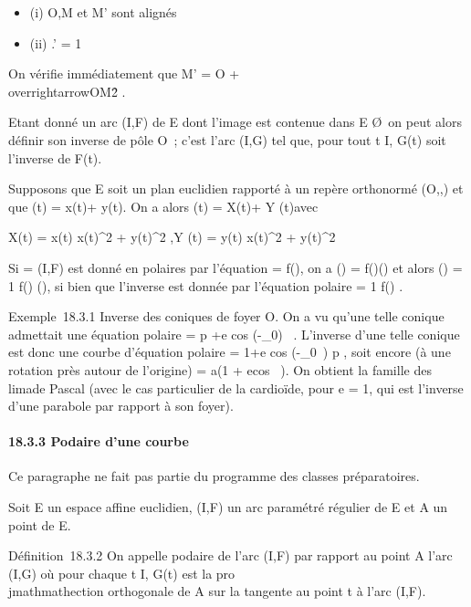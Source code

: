\documentclass[]{article}
\begin{document}
\begin{itemize}
\itemsep1pt\parskip0pt
\item
  (i) O,M et M' sont alignés
\item
  (ii) \overlineOM.\overlineOM' =
  1
\end{itemize}

On vérifie immédiatement que M' = O +
\overrightarrowOM \over
\\overrightarrowOM\^2
.

Etant donné un arc (I,F) de E dont l'image est contenue dans E
\diagdown\O\, on peut alors définir son
inverse de pôle O~; c'est l'arc (I,G) tel que, pour tout t \in I, G(t)
soit l'inverse de F(t).

Supposons que E soit un plan euclidien rapporté à un repère orthonormé
(O,\vec\imath,) et que
\overrightarrowOF(t) = x(t)\vec\imath +
y(t). On a alors
\overrightarrowOG(t) = X(t)\vec\imath +
Y (t) avec

X(t) = x(t) \over x(t)^2 +
y(t)^2 ,\quad Y (t) = y(t)
\over x(t)^2 + y(t)^2

Si \Gamma = (I,F) est donné en polaires par l'équation \rho = f(\theta), on a
\overrightarrowOF(\theta) =
f(\theta)\vecu(\theta) et alors
\overrightarrowOG(\theta) = 1 \over
f(\theta) \vecu(\theta), si bien que l'inverse est donnée par
l'équation polaire \rho = 1 \over f(\theta) .

Exemple~18.3.1 Inverse des coniques de foyer O. On a vu qu'une telle
conique admettait une équation polaire \rho = p +e cos (\theta-\theta_0)~ . L'inverse d'une
telle conique est donc une courbe d'équation polaire \rho =
1+e cos (\theta-\theta_0~) \over
p , soit encore (à une rotation près autour de l'origine) \rho = a(1 +
ecos~ \theta). On obtient la famille des
lima\ccons de Pascal (avec le cas particulier de la
cardioïde, pour e = 1, qui est l'inverse d'une parabole par rapport à
son foyer).

\paragraph{18.3.3 Podaire d'une courbe}

Ce paragraphe ne fait pas partie du programme des classes préparatoires.

Soit E un espace affine euclidien, (I,F) un arc paramétré régulier de E
et A un point de E.

Définition~18.3.2 On appelle podaire de l'arc (I,F) par rapport au point
A l'arc (I,G) où pour chaque t \in I, G(t) est la pro\\jmathmathection orthogonale
de A sur la tangente au point t à l'arc (I,F).
\end{document}
